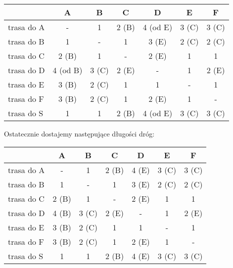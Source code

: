 \documentclass[a4paper, oneside]{article}
\begin{document}
\begin{description}
    \begin{table}[H]
    \centering
    \begin{tabular}{|l|c|c|c|c|c|c|}
    \hline
    & \textbf{A} & \textbf{B} 
    & \textbf{C} & \textbf{D} 
    & \textbf{E} & \textbf{F} \\ \hline\hline
    trasa do A & -        & 1     & 2 (B) & 4 \cellcolor{green!10}(od E) & 3 (C) & 3 (C) \\ \hline
    trasa do B & 1        & -     & 1     & 3 (E)    & 2 (C) & 2 (C) \\ \hline
    trasa do C & 2 (B)    & 1     & -     & 2 (E)    & 1     & 1     \\ \hline
    trasa do D & 4 \cellcolor{green!10}(od B) & 3 (C) & 2 (E) & -        & 1     & 2 (E) \\ \hline
    trasa do E & 3 (B)    & 2 (C) & 1     & 1        & -     & 1     \\ \hline
    trasa do F & 3 (B)    & 2 (C) & 1     & 2 (E)    & 1     & -     \\ \hline
    trasa do S & 1        & 1     & 2 (B) & 4 \cellcolor{green!10}(od E) & 3 (C) & 3 (C) \\ \hline
    \end{tabular}
    \end{table}

    Ostatecznie dostajemy następujące długości dróg:

    \begin{table}[H]
    \centering
    \begin{tabular}{|l|c|c|c|c|c|c|}
    \hline
    & \textbf{A} & \textbf{B} 
    & \textbf{C} & \textbf{D} 
    & \textbf{E} & \textbf{F} \\ \hline\hline
    trasa do A & -     & 1     & 2 (B) & 4 (E) & 3 (C) & 3 (C) \\ \hline
    trasa do B & 1     & -     & 1     & 3 (E) & 2 (C) & 2 (C) \\ \hline
    trasa do C & 2 (B) & 1     & -     & 2 (E) & 1     & 1     \\ \hline
    trasa do D & 4 (B) & 3 (C) & 2 (E) & -     & 1     & 2 (E) \\ \hline
    trasa do E & 3 (B) & 2 (C) & 1     & 1     & -     & 1     \\ \hline
    trasa do F & 3 (B) & 2 (C) & 1     & 2 (E) & 1     & -     \\ \hline
    trasa do S & 1     & 1     & 2 (B) & 4 (E) & 3 (C) & 3 (C) \\ \hline
    \end{tabular}
    \end{table}
    

\end{description}
\end{document}
